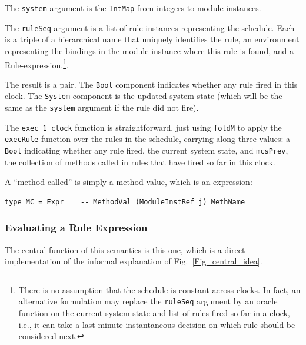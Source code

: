 \documentclass[11pt]{article}
\newcommand{\term}[1]{\texttt{#1}}
\begin{document}
The \term{system} argument is the \term{IntMap} from integers to
module instances.

The \term{ruleSeq} argument is a list of rule instances representing
the schedule.  Each is a triple of a hierarchical name that uniquely
identifies the rule, an environment representing the bindings in the
module instance where this rule is found, and a
Rule-expression.\footnote{ There is no assumption that the schedule is
constant across clocks.  In fact, an alternative formulation may
replace the \term{ruleSeq} argument by an oracle function on the
current system state and list of rules fired so far in a clock, i.e.,
it can take a last-minute instantaneous decision on which rule should
be considered next.}.

The result is a pair. The \term{Bool} component indicates whether any
rule fired in this clock. The \term{System} component is the updated
system state (which will be the same as the \term{system} argument if
the rule did not fire).

The \verb|exec_1_clock| function is straightforward, just using
\term{foldM} to apply the \term{execRule} function over the rules in
the schedule, carrying along three values: a \term{Bool} indicating
whether any rule fired, the current system state, and \term{mcsPrev},
the collection of methods called in rules that have fired so far in
this clock.

A ``method-called'' is simply a method value, which is an expression:

\begin{Verbatim}[frame=single, commandchars=\\\{\}]
type MC = Expr    -- MethodVal (ModuleInstRef j) MethName
\end{Verbatim}


\subsubsection{Evaluating a Rule Expression}

The central function of this semantics is this one, which is a direct
implementation of the informal explanation of
Fig.~\ref{Fig_central_idea}.
\end{document}

